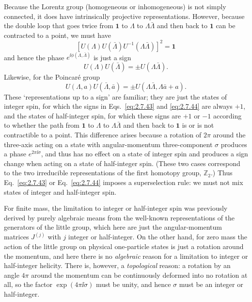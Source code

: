 Because the Lorentz group (homogeneous or inhomogeneous) is not simply
connected, it does have intrinsically projective representations. However,
because the double loop that goes twice from $\mathbf{1}$ to $\Lambda$ to
$\Lambda\bar\Lambda$ and then back to $\mathbf{1}$ can be contracted to a
point, we must have
\begin{equation*}
  \left[U(\Lambda)U(\bar\Lambda)
    U^{-1}(\Lambda\bar\Lambda)\right]^2=\mathbf{1}
\end{equation*}
and hence the phase $e^{\ii\phi(\Lambda,\bar\Lambda)}$ is just a sign
\begin{equation}
  U(\Lambda)U(\bar\Lambda)=\mathord{\pm}U(\Lambda\bar\Lambda).
  \tag{2.7.43}\label{eq:2.7.43}
\end{equation}
Likewise, for the Poincar\'e group
\begin{equation}
  U(\Lambda,a)U(\bar\Lambda,\bar a)
    =\mathord{\pm}U(\Lambda\bar\Lambda,\Lambda\bar a+a).
  \tag{2.7.44}\label{eq:2.7.44}
\end{equation}
These `representations up to a sign' are familiar; they are just the states of
integer spin, for which the signs in Eqs.~\eqref{eq:2.7.43} and \eqref{eq:2.7.44} are always $+1$,
and the states of half-integer spin, for which these signs are $+1$ or $-1$
according to whether the path from $\mathbf{1}$ to $\Lambda$ to
$\Lambda\bar\Lambda$ and then back to $\mathbf{1}$ is or is not contractible to
a point. This difference arises because a rotation of $2\pi$ around the
three-axis acting on a state with angular-momentum three-component $\sigma$
produces a phase $e^{2\pi \ii\sigma}$, and thus has no effect on a state of
integer spin and produces a sign change when acting on a state of half-integer
spin. (These two cases correspond to the two irreducible representations of the
first homotopy group, $\mathbb{Z}_2$.) Thus Eq.~\eqref{eq:2.7.43} or Eq.~\eqref{eq:2.7.44} imposes a
superselection rule: we must not mix states of integer and half-integer spin.

For finite mass, the limitation to integer or half-integer spin was previously
derived by purely algebraic means from the well-known representations of the
generators of the little group, which here are just the angular-momentum
matrices $J^{(j)}$ with $j$ integer or half-integer. On the other hand, for zero
mass the action of the little group on physical one-particle states is just a
rotation around the momentum, and here there is no \emph{algebraic} reason for
a limitation to integer or half-integer helicity. There is, however, a
\emph{topological} reason: a rotation by an angle $4\pi$ around the momentum can
be continuously deformed into no rotation at all, so the factor
$\exp(4\pi \ii\sigma)$ must be unity, and hence $\sigma$ must be an integer or
half-integer.

